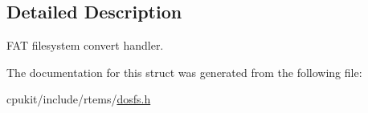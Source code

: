 \subsection{Detailed Description}
F\+AT filesystem convert handler. 

The documentation for this struct was generated from the following file\+:\begin{DoxyCompactItemize}
\item 
cpukit/include/rtems/\mbox{\hyperlink{dosfs_8h}{dosfs.\+h}}\end{DoxyCompactItemize}

